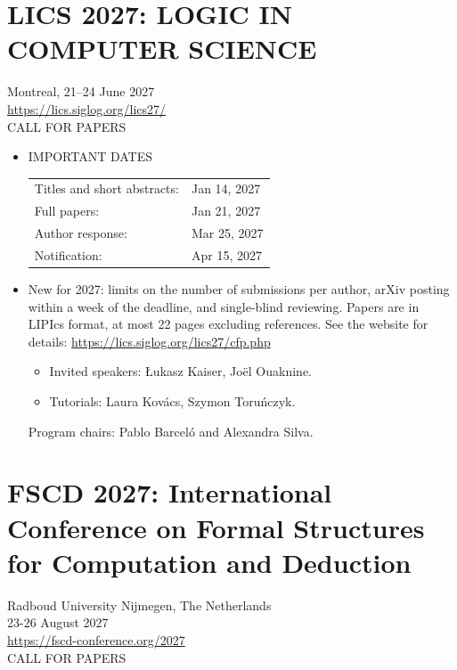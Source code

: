 \documentclass[prodmode,acmtecs]{acmsmall} %
\begin{document}
\section{LICS 2027: LOGIC IN COMPUTER SCIENCE }\label{LICS2027}  Montreal, 21–24 June 2027\\ 
  \href{https://lics.siglog.org/lics27/}{https://lics.siglog.org/lics27/}\\ 
CALL FOR PAPERS 

\begin{itemize}\item  IMPORTANT DATES 
 
\begin{tabulary}{\linewidth}{LL}Titles and short abstracts:  & Jan 14, 2027 \\
Full papers:  & Jan 21, 2027 \\
Author response:  & Mar 25, 2027 \\
Notification:  & Apr 15, 2027 \\
\end{tabulary}
 
\item  New for 2027: limits on the number of submissions per author, arXiv posting within a week of the deadline, and single-blind reviewing. Papers are in LIPIcs format, at most 22 pages excluding references. See the website for details: \href{https://lics.siglog.org/lics27/cfp.php}{https://lics.siglog.org/lics27/cfp.php} 
 
\begin{itemize}\item  Invited speakers: Łukasz Kaiser, Joël Ouaknine.
\item  Tutorials: Laura Kovács, Szymon Toruńczyk.
\end{itemize} 
  Program chairs: Pablo Barceló and Alexandra Silva. 
 
\end{itemize}\section{FSCD 2027: International Conference on Formal Structures for Computation and Deduction}\label{FSCD2027}  Radboud University Nijmegen, The Netherlands\\ 
  23-26 August 2027\\ 
  \href{https://fscd-conference.org/2027}{https://fscd-conference.org/2027}\\ 
CALL FOR PAPERS 
\end{document}
